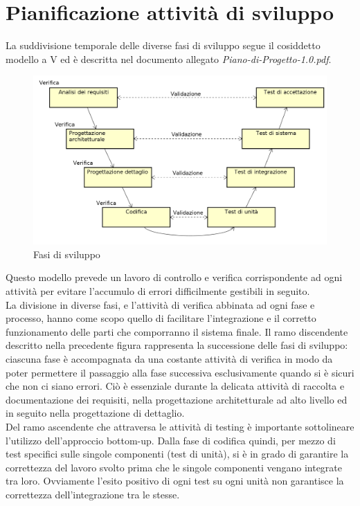 \documentclass[a4paper,11pt]{article}
\begin{document}
\section{Pianificazione attività di sviluppo}
\label{Appendice A}
La suddivisione temporale delle diverse fasi di sviluppo segue il cosiddetto modello a V ed è descritta nel documento allegato \textit{Piano-di-Progetto-1.0.pdf}.
\begin{figure}[h!]
\centering
\includegraphics[scale=0.4]{../images/vmodel-final4.png}
\caption{Fasi di sviluppo}
\end{figure} 
Questo modello prevede un lavoro di controllo e verifica corrispondente ad ogni attività per evitare l'accumulo di errori difficilmente gestibili in seguito.\\
La divisione in diverse fasi, e l'attività di verifica abbinata ad ogni fase e processo, hanno come scopo quello di facilitare l'integrazione e il corretto funzionamento delle parti che comporranno il sistema finale.
Il ramo discendente descritto nella precedente figura rappresenta la successione delle fasi di sviluppo: ciascuna fase è accompagnata da una costante attività di verifica in modo da poter permettere il passaggio alla fase successiva esclusivamente quando si è sicuri che non ci siano errori. Ciò è essenziale durante la delicata attività di raccolta e documentazione dei requisiti, nella progettazione architetturale ad alto livello ed in seguito nella progettazione di dettaglio.\\ 
Del ramo ascendente che attraversa le attività di testing è importante sottolineare l'utilizzo dell'approccio bottom-up.
Dalla fase di codifica quindi, per mezzo di test specifici sulle singole componenti (test di unità), si è in grado di garantire la correttezza del lavoro svolto prima che le singole componenti vengano integrate tra loro. Ovviamente l'esito positivo di ogni test su ogni unità non garantisce la correttezza dell'integrazione tra le stesse. \\
\newpage
\end{document}
